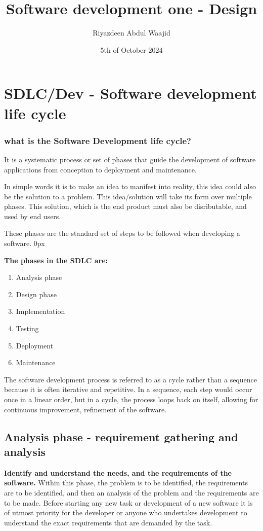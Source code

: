 \documentclass[a4paper]{article}
\title{Software development one - Design}
\author{Riyazdeen Abdul Waajid}
\date{5th of October 2024}
\begin{document}
\maketitle
\tableofcontents    
\newpage    
\section{SDLC/Dev - Software development life cycle}
\subsubsection{\textbf{what is the Software Development life cycle?}}
It is a systematic process or set of phases that guide the development of software applications from conception to deployment and maintenance. 

In simple words it is to make an idea to manifest into reality, this idea could also
be the solution to a problem. This idea/solution will take its form over multiple
phases. This solution, which is the end product must also be disributable, and used by end users.

These phases are the standard set of steps to be followed when developing a software.
\parindent 0px

\textbf{The phases in the SDLC are:}
\begin{enumerate}
    \item Analysis phase  
    \item Design phase  
    \item Implementation
    \item Testing
    \item Deployment
    \item Maintenance
        

\end{enumerate}

The software development process is referred to as a cycle rather than a sequence because it is often iterative and repetitive.
In a sequence, each step would occur once in a linear order, but in a cycle, the process loops back on itself, allowing for 
continuous improvement, refinement of the software.
\subsection{Analysis phase - requirement gathering and analysis}
\textbf{Identify and understand the needs, and the requirements of the software.} Within this phase, the problem is to be identified, the requirements are to be identified, and then an analysis of the problem
and the requirements are to be made.
Before starting any new task or development of a new software it is of utmost priority for the developer or anyone who undertakes development to understand
the exact requirements that are demanded by the task. 
\end{document}
